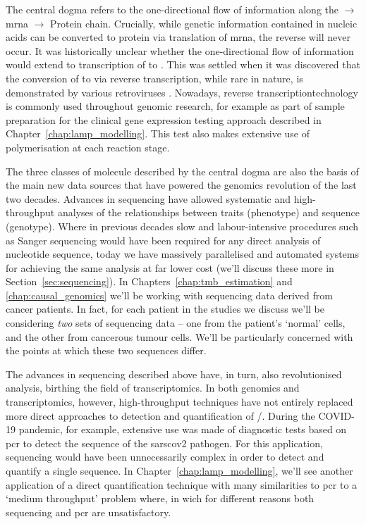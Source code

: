 \documentclass[thesis.tex]{subfiles}
\begin{document}
The central dogma refers to the one-directional flow of information along the  $\rightarrow$ \gls{mrna} $\rightarrow$ Protein chain. Crucially, while genetic information contained in nucleic acids can be converted to protein via translation of \gls{mrna}, the reverse will never occur. It was historically unclear whether the one-directional flow of information would extend to transcription of  to . This was settled when it was discovered that the conversion of   to   via reverse transcription, while rare in nature, is demonstrated by various retroviruses \citep{baltimore_rna-dependent_1970, temin_rna-dependent_1970, coffin_discovery_2016}. Nowadays, reverse transcriptiontechnology  is commonly used throughout genomic research, for example as part of sample preparation for the clinical gene expression testing approach described in Chapter~\ref{chap:lamp_modelling}. This test also makes extensive use of  polymerisation at each reaction stage.

The three classes of molecule described by the central dogma are also the basis of the main new data sources that have powered the genomics revolution of the last two decades. Advances in  sequencing have allowed systematic and high-throughput analyses of the relationships between traits (phenotype) and  sequence (genotype). Where in previous decades slow and labour-intensive procedures such as Sanger sequencing \citep{sanger_dna_1977} would have been required for any direct analysis of nucleotide sequence, today we have massively parallelised and automated systems for achieving the same analysis at far lower cost (we'll discuss these more in Section~\ref{sec:sequencing}). In Chapters~\ref{chap:tmb_estimation} and \ref{chap:causal_genomics} we'll be working with  sequencing data derived from cancer patients. In fact, for each patient in the studies we discuss we'll be considering \emph{two} sets of  sequencing data -- one from the patient's `normal' cells, and the other from cancerous tumour cells. We'll be particularly concerned with the points at which these two sequences differ.

The advances in sequencing described above have, in turn, also revolutionised  analysis, birthing the field of transcriptomics. In both genomics and transcriptomics, however, high-throughput techniques have not entirely replaced more direct approaches to detection and quantification of /. During the COVID-19 pandemic, for example, extensive use was made of diagnostic tests based on \gls{pcr} to detect the  sequence of the \gls{sarscov2} pathogen. For this application, sequencing would have been unnecessarily complex in order to detect and quantify a single  sequence. In Chapter~\ref{chap:lamp_modelling}, we'll see another application of a direct quantification technique with many similarities to \gls{pcr} to a `medium throughput' problem where, in wich for different reasons both sequencing and \gls{pcr} are unsatisfactory.
\end{document}
